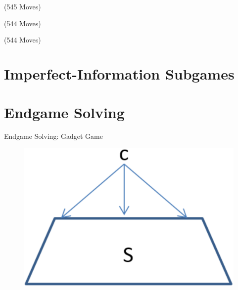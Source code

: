 \documentclass{beamer}
\theoremstyle{definition}
\begin{document}
  \begin{frame}{\chessTitle (545 Moves)}
    \begin{figure}[H]
      \centering
      \showboard
    \end{figure}
  \end{frame}

  \begin{frame}{\chessTitle (544 Moves)}
    \begin{figure}[H]
      \centering
      \showboard
    \end{figure}
  \end{frame}

  \begin{frame}{\chessTitle (544 Moves)}
    \begin{figure}[H]
      \centering
      \showboard
    \end{figure}
    \pause
  \end{frame}

  \section{Imperfect-Information Subgames}

  \section{Endgame Solving}
  \begin{frame}{Endgame Solving: Gadget Game}
    \begin{figure}
      \centering
      \includegraphics[width=.5\textwidth]{../img/endgame-solving-gadget.png}
    \end{figure}
  \end{frame}
\end{document}
